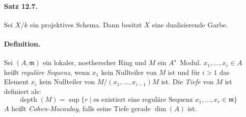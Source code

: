 \paragraph{Satz 12.7.}\label{12.7} Sei $X/k$ ein projektives Schema. Dann besitzt $X$ eine dualisierende Garbe.

\iffalse
\paragraph{Beweis.} Sei $j:X\hookrightarrow P=\mathbf{P}_k^N$ eine abgeschlossene Immersion, $n=\dim(X),\ r=\operatorname{codim}(X)$. Setze $\omega_X^0=j^\ast\operatorname{\mathcal{E}xt}^r_P(j_\ast\mathcal{O}_X,\omega_P)$. Nach \hyperref[12.6]{Lemma 12.6} gilt für alle $\mathcal{F}\in\mathbf{Mod}(X)$:
\[\operatorname{Hom}_X(\mathcal{F},\omega_X^0) \cong\operatorname{Ext}_P^r(j_\ast\mathcal{F},\omega_P) \]
Ist $\mathcal{F}$ kohärent, so gilt nach \hyperref[12.1]{Satz 12.1} und \hyperref[9.26]{Lemma 9.26}:
\[\operatorname{Ext}_P^r(j_\ast\mathcal{F},\omega_P)\cong\mathrm{H}^{N-r}(P,j_\ast\mathcal{F})'\cong\mathrm{H}^n(X,\mathcal{F})' \]
\fi

\paragraph{Definition.} Sei $(A,\mathfrak{m})$ ein lokaler, noetherscher Ring und $M$ ein $A$"~Modul. $x_1,\ldots,x_r\in A$ heißt \textit{reguläre Sequenz}, wenn $x_1$ kein Nullteiler von $M$ ist und für $i>1$ das Element $x_i$ kein Nullteiler von $M/(x_1,\ldots,x_{i-1})M$ ist. Die \textit{Tiefe} von $M$ ist definiert als:
\[\operatorname{depth}(M) = \sup\{r\mid \text{es existiert eine reguläre Sequenz }x_1,\ldots,x_r\in\mathfrak{m}\} \]
$A$ heißt \textit{Cohen-Macaulay}, falls seine Tiefe gerade $\dim(A)$ ist.

